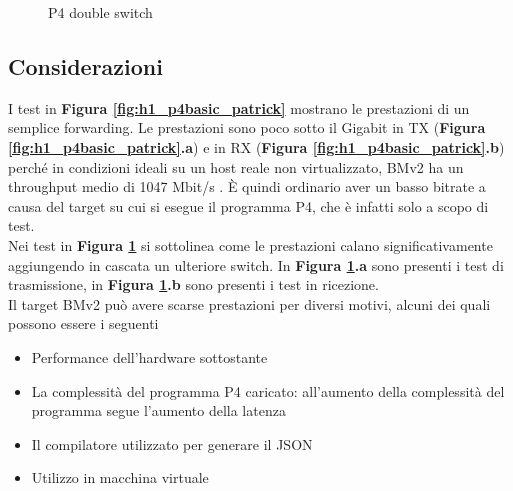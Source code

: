 \FloatBarrier
\begin{figure}%
    \centering
    \qquad
    \caption{P4 double switch}%
    \label{fig:h1_p4double_patrick}%
\end{figure}
\FloatBarrier

\subsection*{Considerazioni}
I test in \textbf{{Figura \ref{fig:h1_p4basic_patrick}}}
 mostrano le prestazioni di un semplice forwarding. Le prestazioni sono poco sotto il Gigabit in TX (\textbf{{Figura \ref{fig:h1_p4basic_patrick}.a}}) e in RX (\textbf{{Figura \ref{fig:h1_p4basic_patrick}.b}}) perché in condizioni ideali su un host reale non virtualizzato, BMv2 ha un throughput medio di 1047 Mbit/s \cite{noauthor_behavioral_2022}. È quindi ordinario aver un basso bitrate a causa del target su cui si esegue il programma P4, che è infatti solo a scopo di test. 
\leavevmode\newline
\\
Nei test in \textbf{{Figura \ref{fig:h1_p4double_patrick}}} si sottolinea come le prestazioni calano significativamente aggiungendo in cascata un ulteriore switch. In \textbf{{Figura \ref{fig:h1_p4double_patrick}.a}} sono presenti i test di trasmissione, in \textbf{{Figura \ref{fig:h1_p4double_patrick}.b}} sono presenti i test in ricezione.
\leavevmode\newline
\\
Il target BMv2 può avere scarse prestazioni per diversi motivi, alcuni dei quali possono essere i seguenti
\begin{itemize}
    \item Performance dell'hardware sottostante
    \item La complessità del programma P4 caricato: all'aumento della complessità del programma segue l'aumento della latenza
    \item Il compilatore utilizzato per generare il JSON
    \item Utilizzo in macchina virtuale
\end{itemize}
